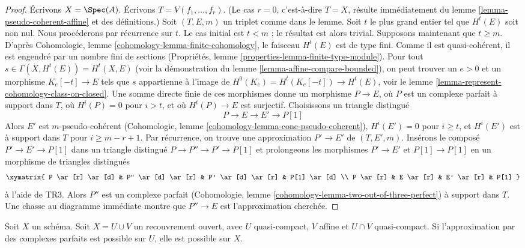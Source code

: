\begin{proof}
Écrivons $X = \Spec(A)$. Écrivons $T = V(f_1, \ldots, f_r)$.
(Le cas $r = 0$, c'est-à-dire $T = X$, résulte immédiatement du
lemme \ref{lemma-pseudo-coherent-affine} et des définitions.)
Soit $(T, E, m)$ un triplet comme dans le lemme.
Soit $t$ le plus grand entier tel que $H^t(E)$ soit non nul.
Nous procéderons par récurrence sur $t$. Le cas initial est $t < m$ ;
le résultat est alors trivial. Supposons maintenant que $t \geq m$. D'après
Cohomologie, lemme \ref{cohomology-lemma-finite-cohomology},
le faisceau $H^t(E)$ est de type fini. Comme il est quasi-cohérent,
il est engendré par un nombre fini de sections
(Propriétés, lemme \ref{properties-lemma-finite-type-module}).
Pour tout $s \in \Gamma(X, H^t(E)) = H^t(X, E)$
(voir la démonstration du lemme \ref{lemma-affine-compare-bounded}),
on peut trouver un $e > 0$ et un morphisme $K_e[-t] \to E$
tels que $s$ appartienne à l'image de
$H^0(K_e) = H^t(K_e[-t]) \to H^t(E)$, voir le
lemme \ref{lemma-represent-cohomology-class-on-closed}.
Une somme directe finie de ces morphismes donne un morphisme
$P \to E$, où $P$ est un complexe parfait à support dans $T$,
où $H^i(P) = 0$ pour $i > t$, et où $H^t(P) \to E$ est
surjectif. Choisissons un triangle distingué
$$
P \to E \to E' \to P[1]
$$
Alors $E'$ est $m$-pseudo-cohérent
(Cohomologie, lemme \ref{cohomology-lemma-cone-pseudo-coherent}),
$H^i(E') = 0$ pour $i \geq t$, et
$H^i(E')$ est à support dans $T$ pour $i \geq m - r + 1$.
Par récurrence, on trouve une approximation $P' \to E'$
de $(T, E', m)$. Insérons le composé $P' \to E' \to P[1]$
dans un triangle distingué $P \to P'' \to P' \to P[1]$
et prolongeons les morphismes $P' \to E'$ et $P[1] \to P[1]$ en
un morphisme de triangles distingués
$$
\xymatrix{
P \ar[r] \ar[d] & P'' \ar[d] \ar[r] & P' \ar[d] \ar[r] & P[1] \ar[d] \\
P \ar[r] &  E \ar[r] & E' \ar[r] & P[1]
}
$$
à l'aide de TR3. Alors $P''$ est un complexe parfait
(Cohomologie, lemme \ref{cohomology-lemma-two-out-of-three-perfect})
à support dans $T$.
Une chasse au diagramme immédiate montre que $P'' \to E$ est l'approximation
cherchée.
\end{proof}

\begin{lemma}
\label{lemma-induction-step}
Soit $X$ un schéma. Soit $X = U \cup V$ un recouvrement ouvert,
avec $U$ quasi-compact, $V$ affine et $U \cap V$ quasi-compact.
Si l'approximation par des complexes parfaits est possible sur $U$,
elle est possible sur $X$.
\end{lemma}

